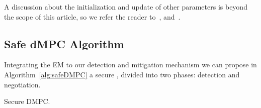 \documentclass{ifacconf}  %
\begin{document}
\begin{remark}
A discussion about the initialization and update of other parameters is beyond the scope of this article, so we refer the reader to~\cite{Bishop2006}, and~\cite{DempsterEtAl1977}.
\end{remark}

\subsection{Safe dMPC Algorithm}\label{ssec:safe_algo}
Integrating the EM to our detection and mitigation mechanism we can propose in Algorithm~\ref{alg:safeDMPC} a secure \dmpc{}, divided into two phases: detection and negotiation.
\begin{algorithm2e}[h]
  \DontPrintSemicolon
 \caption{Secure DMPC.}\label{alg:safeDMPC}
\end{algorithm2e}
\end{document}
